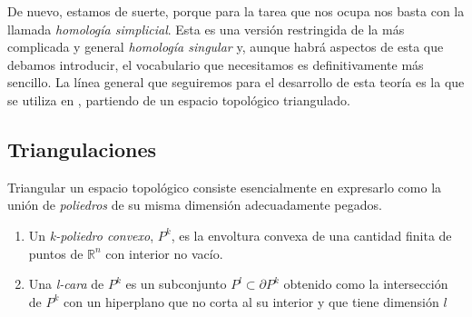 De nuevo, estamos de suerte, porque para la tarea que nos ocupa nos basta con la llamada \textit{homología simplicial}. Esta es una versión restringida de la más complicada y general \textit{homología singular} y, aunque habrá aspectos de esta que debamos introducir, el vocabulario que necesitamos es definitivamente más sencillo. La línea general que seguiremos para el desarrollo de esta teoría es la que se utiliza en \cite{munoz2021}, partiendo de un espacio topológico triangulado.


\bigskip

\subsection{Triangulaciones}
\label{subsec:triangulaciones}

Triangular un espacio topológico consiste esencialmente en expresarlo como la unión de \textit{poliedros} de su misma dimensión adecuadamente pegados.

\begin{definition} \hfill

    \begin{enumerate}[label=(\roman*)]
        \item  Un \textit{k-poliedro convexo}, $P^k$, es la envoltura convexa de una cantidad finita de puntos de $\mathbb{R}^n$ con interior no vacío.
        \item Una \textit{l-cara} de $P^k$ es un subconjunto $P^l\subset \partial P^k$ obtenido como la intersección de $P^k$ con un hiperplano que no corta al su interior y que tiene dimensión $l$
    \end{enumerate}
   
\end{definition}

\bigskip

